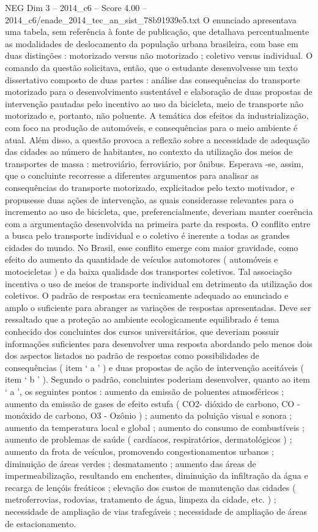 \begin{textsample}{NEG Dim 3 – 2014\_c6 – Score 4.00 – 2014\_c6/enade\_2014\_tec\_an\_sist\_78b91939e5.txt}
O enunciado apresentava uma tabela, sem referência à fonte de publicação, que detalhava percentualmente as modalidades de deslocamento da população urbana brasileira, com base em duas distinções : motorizado versus não motorizado ; coletivo versus individual.
O comando da questão solicitava, então, que o estudante desenvolvesse um texto dissertativo composto de duas partes : análise das consequências do transporte motorizado para o desenvolvimento sustentável e elaboração de duas propostas de intervenção pautadas pelo incentivo ao uso da bicicleta, meio de transporte não motorizado e, portanto, não poluente.
A temática dos efeitos da industrialização, com foco na produção de automóveis, e consequências para o meio ambiente é atual.
Além disso, a questão provoca a reflexão sobre a necessidade de adequação das cidades ao número de habitantes, no contexto da utilização dos meios de transportes de massa : metroviário, ferroviário, por ônibus.
Esperava -se, assim, que o concluinte recorresse a diferentes argumentos para analisar as consequências do transporte motorizado, explicitados pelo texto motivador, e propusesse duas ações de intervenção, as quais considerasse relevantes para o incremento ao uso de bicicleta, que, preferencialmente, deveriam manter coerência com a argumentação desenvolvida na primeira parte da resposta.
O conflito entre a busca pelo transporte individual e o coletivo é inerente a todas as grandes cidades do mundo.
No Brasil, esse conflito emerge com maior gravidade, como efeito do aumento da quantidade de veículos automotores ( automóveis e motocicletas ) e da baixa qualidade dos transportes coletivos.
Tal associação incentiva o uso de meios de transporte individual em detrimento da utilização dos coletivos.
O padrão de respostas era tecnicamente adequado ao enunciado e amplo o suficiente para abranger as variações de respostas apresentadas.
Deve ser ressaltado que a proteção ao ambiente ecologicamente equilibrado é tema conhecido dos concluintes dos cursos universitários, que deveriam possuir informações suficientes para desenvolver uma resposta abordando pelo menos dois dos aspectos listados no padrão de respostas como possibilidades de consequências ( item ‘ a ’ ) e duas propostas de ação de intervenção aceitáveis ( item ‘ b ’ ).
Segundo o padrão, concluintes poderiam desenvolver, quanto ao item ‘ a ’, os seguintes pontos : aumento da emissão de poluentes atmosféricos ; aumento da emissão de gases de efeito estufa ( CO2- dióxido de carbono, CO - monóxido de carbono, O3 - Ozônio ) ; aumento da poluição visual e sonora ; aumento da temperatura local e global ; aumento do consumo de combustíveis ; aumento de problemas de saúde ( cardíacos, respiratórios, dermatológicos ) ; aumento da frota de veículos, promovendo congestionamentos urbanos ; diminuição de áreas verdes ; desmatamento ; aumento das áreas de impermeabilização, resultando em enchentes, diminuição da infiltração da água e recarga de lençóis freáticos ; elevação dos custos de manutenção das cidades ( metroferrovias, rodovias, tratamento de água, limpeza da cidade, etc. ) ; necessidade de ampliação de vias trafegáveis ; necessidade de ampliação de áreas de estacionamento.

\end{textsample}
